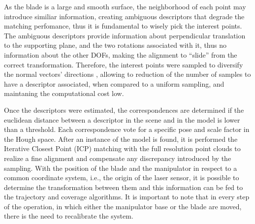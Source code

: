 As the blade is a large and smooth surface, the neighborhood of each point may
introduce similiar information, creating ambiguous descriptors that degrade the
matching perfomance, thus it is fundamental to wisely pick the interest points.
The ambiguous descriptors provide information about perpendicular translation to
the supporting plane, and the two rotations associated with it, thus no
information about the other DOFs, making the alignment to ``slide'' from the
correct transformation. Therefore, the interest points were sampled to
diversify the normal vectors' directions \cite{Rusinkiewicz2001}, allowing to
reduction of the number of samples to have a descriptor associated, when
compared to a uniform sampling, and maintaning the computational cost low.


Once the descriptors were estimated, the correspondences are determined if the
euclidean distance between a descriptor in the scene and in the model is lower
than a threshold. Each correspondence vote for a specific pose and scale factor in the
Hough space. After an instance of the model is found, it is performed the 
Iterative Closest Point (ICP) matching with the full resolution point clouds to
realize a fine alignment and compensate any discrepancy introduced by the
sampling. With the position of the blade and the manipulator in respect to a
common coordinate system, i.e., the origin of the laser sensor, it is possible
to determine the transformation between them and this information can be fed to
the trajectory and coverage algorithms. It is important to note that in every
step of the operation, in which either the manipulator base or the blade are
moved, there is the need to recalibrate the system.



